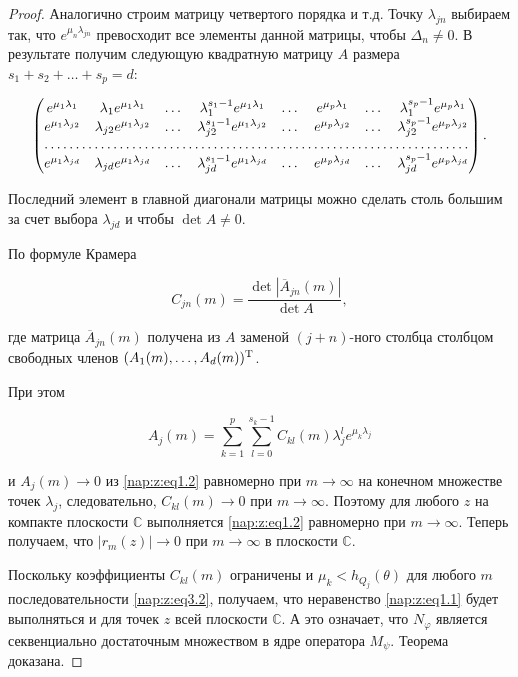 \begin{proof}
 Аналогично строим матрицу четвертого порядка и т.д. Точку $\lambda_{jn}$ выбираем так, что $e^{\mu_n\lambda_{jn}}$  превосходит все элементы данной матрицы, чтобы $\Delta_n \neq 0$. В результате получим следующую квадратную матрицу $A$ размера $s_1+s_2+\dots+s_p=d$: 

\begin{eqnarray*}

\begin{pmatrix} e^{\mu_1\lambda_1}&  \lambda_1 e^{\mu_1\lambda_1} & \dots  &  \lambda_1^{s_1-1} e^{\mu_1\lambda_1} & \dots  &e^{\mu_p \lambda_1} & \dots  & \lambda_1^{s_p-1} e^{\mu_p\lambda_1}\\

e^{\mu_1\lambda_{j2}}&  \lambda_{j2} e^{\mu_1\lambda_{j2}} & \dots  &  \lambda_{j2}^{s_1-1}e^{\mu_1\lambda_{j2}} & \dots   & e^{\mu_p\lambda_{j2}}  &  \dots  & \lambda_{j2}^{s_p-1} e^{\mu_p\lambda_{j2}} \\

\hdotsfor[1] {8} \\

e^{\mu_1\lambda_{jd}}&  \lambda_{jd} e^{\mu_1\lambda_{jd}} & \dots  &  \lambda_{jd}^{s_1-1} e^{\mu_1\lambda_{jd}} & \dots  & e^{\mu_p \lambda_{jd}}  &  \dots  & \lambda_{jd}^{s_p-1} e^{\mu_p \lambda_{jd}} 

 \end{pmatrix}.

\end{eqnarray*}

Последний элемент в главной диагонали матрицы можно сделать столь большим за счет выбора $\lambda_{jd}$ и чтобы $\det A\neq 0$. 

По формуле Крамера 

\[

C_{jn}(m)=\frac {\det |\overline A_{jn}(m)|}{\det A},

 \] 

 где матрица $\overline A_{jn}(m)$ получена из $A$ заменой $(j+n)$-ного столбца столбцом свободных членов $(A_1(m),\dots, A_d(m))^{\rm T}$. 

 При этом 

 \[

  A_j(m)=\sum\limits^{p}_{k=1}\sum\limits^{s_k-1}_{l=0}{C_{kl}(m) \lambda_j^{l}e^{\mu_k \lambda_j}}

  \]

  и $A_j(m)\to 0$ из \eqref{nap:z:eq1.2} равномерно при $m\to \infty$ на конечном множестве точек $\lambda_j$, следовательно, $C_{kl}(m)\to 0$ при $m\to \infty$. Поэтому для любого $z$ на компакте плоскости $\mathbb C$ выполняется \eqref{nap:z:eq1.2} равномерно при $m\to \infty$. Теперь получаем, что $|r_m(z)|\to 0$ при $m\to \infty$ в плоскости $\mathbb C$. 



Поскольку коэффициенты $C_{kl}(m)$ ограничены и $\mu_k< h_{Q_j}(\theta)$ для любого $m$ последовательности \eqref{nap:z:eq3.2}, получаем, что неравенство \eqref{nap:z:eq1.1} будет выполняться и для точек $z$ всей плоскости $\mathbb C$. А это означает, что $N_{\varphi}$ является секвенциально достаточным множеством в ядре оператора $M_\psi$. Теорема доказана. 

\end{proof}
